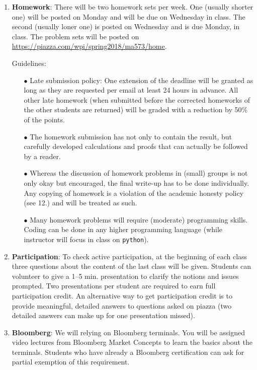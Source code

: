 \documentclass[final, 12pt]{article}
\begin{document}
{\begin{enumerate}
\item
\textbf{Homework}: There will be two homework sets per week. One (usually shorter one) will be posted on Monday and will be due on Wednesday in class. The second (usually loner one) is posted on Wednesday and is due Monday, in class. The problem sets will be posted on \url{https://piazza.com/wpi/spring2018/ma573/home}.

Guidelines:
\begin{itemize}
 \item[$\bullet$] Late submission policy: One extension of the deadline will be granted as long as they are requested per email at least 24 hours in advance. All other late homework (when submitted before the corrected homeworks of the other students are returned) will be graded with a reduction by 50\% of the points.
 \item[$\bullet$] The homework submission has not only to contain the result, but carefully developed calculations and proofs that can actually be followed by a reader.
 \item[$\bullet$] Whereas the discussion of homework problems in (small) groups is not only okay but encouraged, the final write-up has to be done individually. Any copying of homework is a violation of the academic honesty policy (see 12.) and will be treated as such.
 \item[$\bullet$] Many homework problems will require (moderate) programming skills. Coding can be done in any higher programming language (while instructor will focus in class on \texttt{python}).
 \end{itemize}

\vspace{5pt}


\item
\textbf{Participation}: To check active participation, at the beginning of each class three questions about the content of the last class will be given. Students can volunteer to give a 1--5 min. presentation to clarify the notions and issues prompted. Two presentations per student are required to earn full participation credit. An alternative way to get participation credit is to provide meaningful, detailed answers to questions asked on piazza (two detailed answers can make up for one presentation missed).


\vspace{5pt}


\item
\textbf{Bloomberg}: We will relying on Bloomberg terminals. You will be assigned video lectures from Bloomberg Market Concepts to learn the basics about the terminals. Students who have already a Bloomberg certification can ask for partial exemption of this requirement.



\end{enumerate}}
\end{document}

